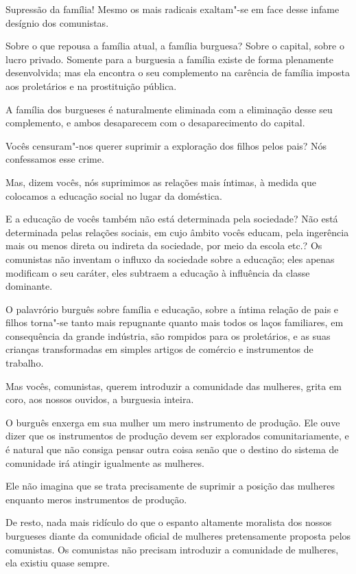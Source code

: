 Supressão da família! Mesmo os mais radicais exaltam"-se em face desse
infame desígnio dos comunistas.

Sobre o que repousa a família atual, a família burguesa? Sobre o
capital, sobre o lucro privado. Somente para a burguesia a família
existe de forma plenamente desenvolvida; mas ela encontra o seu
complemento na carência de família imposta aos proletários e na
prostituição pública.

A família dos burgueses é naturalmente eliminada com a eliminação desse
seu complemento, e ambos desaparecem com o desaparecimento do capital.

Vocês censuram"-nos querer suprimir a exploração dos filhos pelos pais?
Nós confessamos esse crime.

Mas, dizem vocês, nós suprimimos as relações mais íntimas, à medida que
colocamos a educação social no lugar da doméstica.

E a educação de vocês também não está determinada pela sociedade? Não
está determinada pelas relações sociais, em cujo âmbito vocês educam,
pela ingerência mais ou menos direta ou indireta da sociedade, por meio
da escola etc.? Os comunistas não inventam o influxo da sociedade sobre
a educação; eles apenas modificam o seu caráter, eles subtraem a
educação à influência da classe dominante.

O palavrório burguês sobre família e educação, sobre a íntima relação de
pais e filhos torna"-se tanto mais repugnante quanto mais todos os
laços familiares, em consequência da grande indústria, são rompidos
para os proletários, e as suas crianças transformadas em simples
artigos de comércio e instrumentos de trabalho.

Mas vocês, comunistas, querem introduzir a comunidade das mulheres,
grita em coro, aos nossos ouvidos, a burguesia inteira.

O burguês enxerga em sua mulher um mero instrumento de produção. Ele
ouve dizer que os instrumentos de produção devem ser explorados
comunitariamente, e é natural que não consiga pensar outra coisa senão
que o destino do sistema de comunidade irá atingir igualmente as
mulheres.

Ele não imagina que se trata precisamente de suprimir a posição das
mulheres enquanto meros instrumentos de produção.

De resto, nada mais ridículo do que o espanto altamente moralista dos
nossos burgueses diante da comunidade oficial de mulheres pretensamente
proposta pelos comunistas. Os comunistas não precisam introduzir a
comunidade de mulheres, ela existiu quase sempre.


